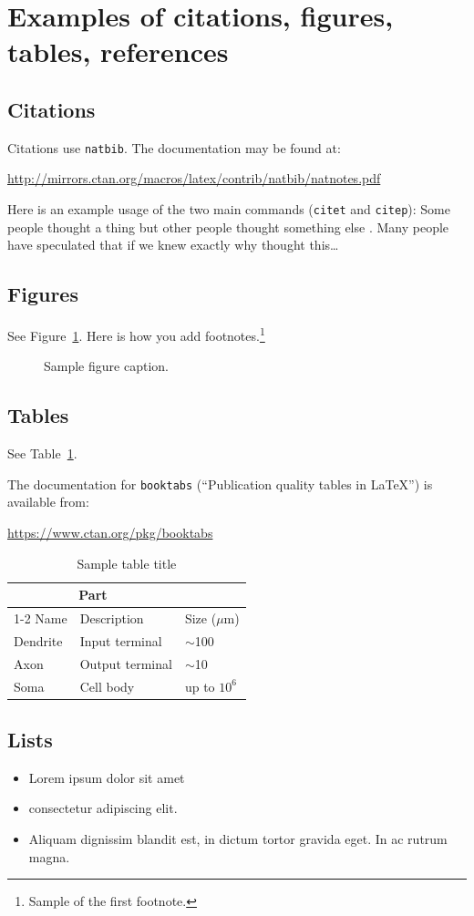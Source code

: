 \section{Examples of citations, figures, tables, references}
\label{sec:others}

\subsection{Citations}
Citations use \verb+natbib+. The documentation may be found at:
\begin{center}
	\url{http://mirrors.ctan.org/macros/latex/contrib/natbib/natnotes.pdf}
\end{center}

Here is an example usage of the two main commands (\verb+citet+ and \verb+citep+): Some people thought a thing \citep{kour2014real, keshet2016prediction} but other people thought something else \citep{kour2014fast}. Many people have speculated that if we knew exactly why \citet{kour2014fast} thought this\dots

\subsection{Figures}
\lipsum[10]
See Figure~\ref{fig:fig1}. Here is how you add footnotes.\footnote{Sample of the first footnote.}
\lipsum[11]

\begin{figure}[htbp]
	\centering
	\fbox{\rule[-.5cm]{4cm}{4cm} \rule[-.5cm]{4cm}{0cm}}
	\caption{Sample figure caption.}
	\label{fig:fig1}
\end{figure}

\subsection{Tables}
See Table~\ref{tab:table}.

The documentation for \verb+booktabs+ (``Publication quality tables in \LaTeX'') is available from:
\begin{center}
	\url{https://www.ctan.org/pkg/booktabs}
\end{center}

\begin{table}[htbp]
	\caption{Sample table title}
	\centering
	\begin{tabular}{lll}
		\toprule
		\multicolumn{2}{c}{Part}                   \\
		\cmidrule(r){1-2}
		Name     & Description     & Size ($\mu$m) \\
		\midrule
		Dendrite & Input terminal  & $\sim$100     \\
		Axon     & Output terminal & $\sim$10      \\
		Soma     & Cell body       & up to $10^6$  \\
		\bottomrule
	\end{tabular}
	\label{tab:table}
\end{table}

\subsection{Lists}
\begin{itemize}
	\item Lorem ipsum dolor sit amet
	\item consectetur adipiscing elit.
	\item Aliquam dignissim blandit est, in dictum tortor gravida eget. In ac rutrum magna.
\end{itemize}

